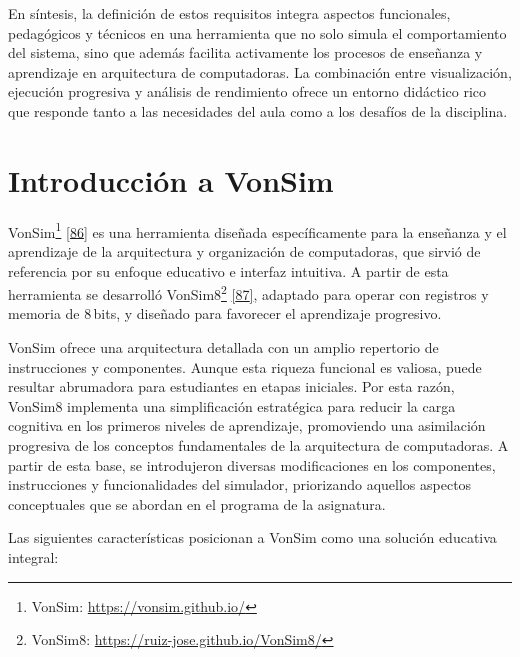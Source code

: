 \documentclass[12pt,oneside]{templates/unerthesis}
\begin{document}
En síntesis, la definición de estos requisitos integra aspectos funcionales, pedagógicos y técnicos en una herramienta que no solo simula el comportamiento del sistema, sino que además facilita activamente los procesos de enseñanza y aprendizaje en arquitectura de computadoras. La combinación entre visualización, ejecución progresiva y análisis de rendimiento ofrece un entorno didáctico rico que responde tanto a las necesidades del aula como a los desafíos de la disciplina.

\hypertarget{introducciuxf3n-a-vonsim}{%
\section{Introducción a VonSim}\label{introducciuxf3n-a-vonsim}}

VonSim\footnote{VonSim: \url{https://vonsim.github.io/}} \protect\hyperlink{ref-vonsim}{{[}86{]}} es una herramienta diseñada específicamente para la enseñanza y el aprendizaje de la arquitectura y organización de computadoras, que sirvió de referencia por su enfoque educativo e interfaz intuitiva. A partir de esta herramienta se desarrolló VonSim8\footnote{VonSim8: \url{https://ruiz-jose.github.io/VonSim8/}} \protect\hyperlink{ref-vonsim8}{{[}87{]}}, adaptado para operar con registros y memoria de 8\,bits, y diseñado para favorecer el aprendizaje progresivo.

VonSim ofrece una arquitectura detallada con un amplio repertorio de instrucciones y componentes. Aunque esta riqueza funcional es valiosa, puede resultar abrumadora para estudiantes en etapas iniciales. Por esta razón, VonSim8 implementa una simplificación estratégica para reducir la carga cognitiva en los primeros niveles de aprendizaje, promoviendo una asimilación progresiva de los conceptos fundamentales de la arquitectura de computadoras. A partir de esta base, se introdujeron diversas modificaciones en los componentes, instrucciones y funcionalidades del simulador, priorizando aquellos aspectos conceptuales que se abordan en el programa de la asignatura.

Las siguientes características posicionan a VonSim como una solución educativa integral:
\end{document}
